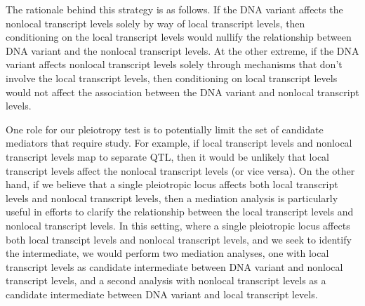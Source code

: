 \documentclass[oneside]{book}
\begin{document}
The rationale behind this strategy is as follows. If the DNA variant affects the nonlocal transcript levels solely by way of local transcript levels, then conditioning on the local transcript levels would nullify the relationship between DNA variant and the nonlocal transcript levels. At the other extreme, if the DNA variant affects nonlocal transcript levels solely through mechanisms that don't involve the local transcript levels, then conditioning on local transcript levels would not affect the association between the DNA variant and nonlocal transcript levels.

One role for our pleiotropy test is to potentially limit the set of candidate mediators that require study. For example, if local transcript levels and nonlocal transcript levels map to separate QTL, then it would be unlikely that local transcript levels affect the nonlocal transcript levels (or vice versa). On the other hand, if we believe that a single pleiotropic locus affects both local transcript levels and nonlocal transcript levels, then a mediation analysis is particularly useful in efforts to clarify the relationship between the local transcript levels and nonlocal transcript levels. In this setting, where a single pleiotropic locus affects both local transcipt levels and nonlocal transcript levels, and we seek to identify the intermediate, we would perform two mediation analyses, one with local transcript levels as candidate intermediate between DNA variant and nonlocal transcript levels, and a second analysis with nonlocal transcript levels as a candidate intermediate between DNA variant and local transcript levels.


\end{document}
